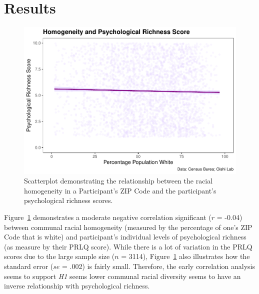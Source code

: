 \documentclass[
  man,floatsintext]{apa7}
\begin{document}
\hypertarget{results}{%
\section{Results}\label{results}}



\begin{figure}[H]
\includegraphics[width=1\linewidth]{Richness-Diversity-Markdown_files/figure-latex/a-path-scatterplot-1} \caption{Scatterplot demonstrating the relationship between the racial homogeneity in a Participant's ZIP Code and the participant's psychological richness scores.}\label{fig:a-path-scatterplot}
\end{figure}





Figure~\ref{fig:a-path-scatterplot} demonstrates a moderate negative correlation significant (\(r\) = -0.04) between communal racial homogeneity (measured by the percentage of one's ZIP Code that is white) and participant's individual levels of psychological richness (as measure by their PRLQ score). While there is a lot of variation in the PRLQ scores due to the large sample size (\(n\) = 3114), Figure~\ref{fig:a-path-scatterplot} also illustrates how the standard error (\(se\) = .002) is fairly small. Therefore, the early correlation analysis seems to support \emph{H1} seems lower communal racial diversity seems to have an inverse relationship with psychological richness.
\end{document}
